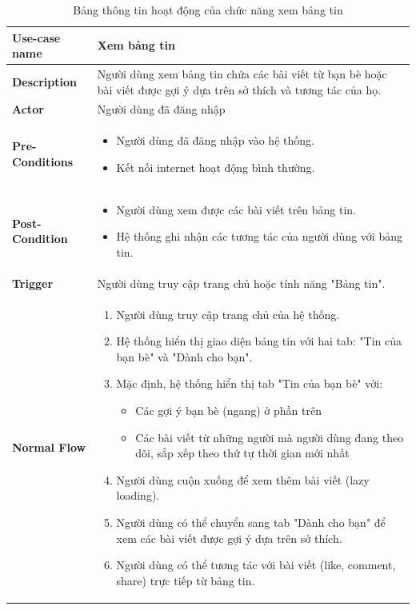 \newpage
\begin{longtable}{|>{\bfseries}m{4cm}|m{10cm}|}
    \caption{Bảng thông tin hoạt động của chức năng xem bảng tin}
    \label{table:usecase-feed}\\
\hline
Use-case name & Xem bảng tin \\
\hline
Description & Người dùng xem bảng tin chứa các bài viết từ bạn bè hoặc bài viết được gợi ý dựa trên sở thích và tương tác của họ. \\
\hline
Actor & Người dùng đã đăng nhập \\
\hline
Pre-Conditions & 
\begin{itemize}
    \item Người dùng đã đăng nhập vào hệ thống.
    \item Kết nối internet hoạt động bình thường.
\end{itemize} \\
\hline
Post-Condition & 
\begin{itemize}
    \item Người dùng xem được các bài viết trên bảng tin.
    \item Hệ thống ghi nhận các tương tác của người dùng với bảng tin.
\end{itemize} \\
\hline
Trigger & Người dùng truy cập trang chủ hoặc tính năng "Bảng tin". \\
\hline
Normal Flow &
\begin{enumerate}
    \item Người dùng truy cập trang chủ của hệ thống.
    \item Hệ thống hiển thị giao diện bảng tin với hai tab: "Tin của bạn bè" và "Dành cho bạn".
    \item Mặc định, hệ thống hiển thị tab "Tin của bạn bè" với:
      \begin{itemize}
        \item Các gợi ý bạn bè (ngang) ở phần trên
        \item Các bài viết từ những người mà người dùng đang theo dõi, sắp xếp theo thứ tự thời gian mới nhất
      \end{itemize}
    \item Người dùng cuộn xuống để xem thêm bài viết (lazy loading).
    \item Người dùng có thể chuyển sang tab "Dành cho bạn" để xem các bài viết được gợi ý dựa trên sở thích.
    \item Người dùng có thể tương tác với bài viết (like, comment, share) trực tiếp từ bảng tin.

\end{enumerate}
\end{longtable}
